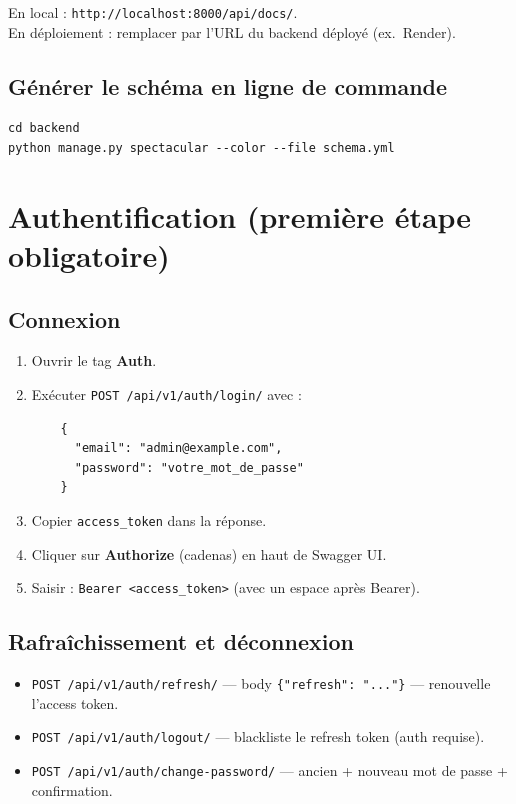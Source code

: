 \documentclass[11pt,a4paper]{article}
\begin{document}
En local : \texttt{http://localhost:8000/api/docs/}.\\
En déploiement : remplacer par l'URL du backend déployé (ex.\ Render).

\subsection{Générer le schéma en ligne de commande}

\begin{verbatim}
cd backend
python manage.py spectacular --color --file schema.yml
\end{verbatim}

\section{Authentification (première étape obligatoire)}

\subsection{Connexion}

\begin{enumerate}[noitemsep]
    \item Ouvrir le tag \textbf{Auth}.
    \item Exécuter \texttt{POST /api/v1/auth/login/} avec :
    \begin{verbatim}
    {
      "email": "admin@example.com",
      "password": "votre_mot_de_passe"
    }
    \end{verbatim}
    \item Copier \texttt{access\_token} dans la réponse.
    \item Cliquer sur \textbf{Authorize} (cadenas) en haut de Swagger UI.
    \item Saisir : \texttt{Bearer <access\_token>} (avec un espace après Bearer).
\end{enumerate}

\subsection{Rafraîchissement et déconnexion}

\begin{itemize}[noitemsep]
    \item \texttt{POST /api/v1/auth/refresh/} --- body \texttt{\{"refresh": "..."\}} --- renouvelle l'access token.
    \item \texttt{POST /api/v1/auth/logout/} --- blackliste le refresh token (auth requise).
    \item \texttt{POST /api/v1/auth/change-password/} --- ancien + nouveau mot de passe + confirmation.
\end{itemize}
\end{document}
